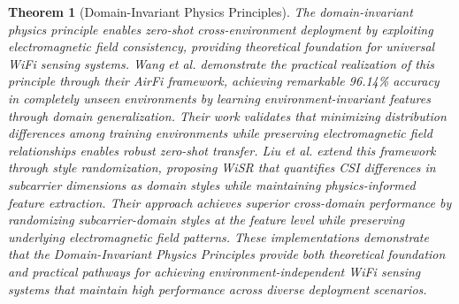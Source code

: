 \documentclass[journal]{IEEEtran}
\newtheorem{theorem}{Theorem}
\begin{document}
\begin{theorem}[Domain-Invariant Physics Principles]
The domain-invariant physics principle enables zero-shot cross-environment deployment by exploiting electromagnetic field consistency, providing theoretical foundation for universal WiFi sensing systems. Wang et al. \cite{wang2022airfi} demonstrate the practical realization of this principle through their AirFi framework, achieving remarkable 96.14\% accuracy in completely unseen environments by learning environment-invariant features through domain generalization. Their work validates that minimizing distribution differences among training environments while preserving electromagnetic field relationships enables robust zero-shot transfer. Liu et al. \cite{liu2023wisr} extend this framework through style randomization, proposing WiSR that quantifies CSI differences in subcarrier dimensions as domain styles while maintaining physics-informed feature extraction. Their approach achieves superior cross-domain performance by randomizing subcarrier-domain styles at the feature level while preserving underlying electromagnetic field patterns. These implementations demonstrate that the Domain-Invariant Physics Principles provide both theoretical foundation and practical pathways for achieving environment-independent WiFi sensing systems that maintain high performance across diverse deployment scenarios.
\end{theorem}
\end{document}
